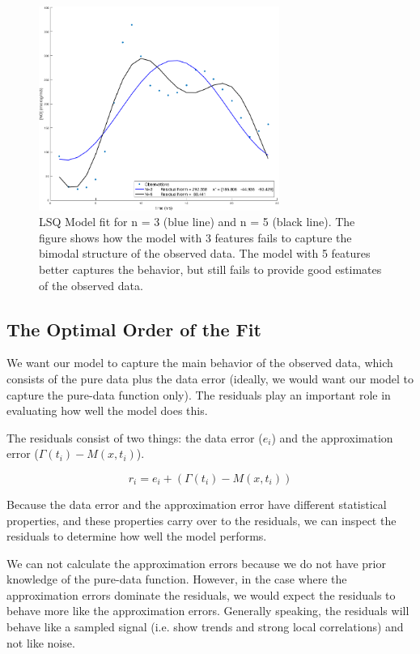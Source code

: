 \begin{figure}[htb]
\centering
\includegraphics[width=0.7\textwidth]{../img/figure1}
\caption{LSQ Model fit for n = 3 (blue line) and n = 5 (black line). The figure shows how the model with 3 features fails to capture the bimodal structure of the observed data. The model with 5 features better captures the behavior, but still fails to provide good estimates of the observed data.}
\label{fig:figure1}
\end{figure}

\subsection{The Optimal Order of the Fit}
We want our model to capture the main behavior of the observed data, which consists of the pure data plus the data error (ideally, we would want our model to capture the pure-data function only). The residuals play an important role in evaluating how well the model does this. 

The residuals consist of two things: the data error ($e_i$) and the approximation error ($\Gamma(t_i) - M(x,t_i)$). 

\begin{equation}
r_{i} = e_{i} + (\Gamma(t_{i}) - M(x,t_{i}))
\label{eq:firstEquation}
\end{equation}


Because the data error and the approximation error have different statistical properties, and these properties carry over to the residuals, we can inspect the residuals to determine how well the model performs. 

We can not calculate the approximation errors because we do not have prior knowledge of the pure-data function. However, in the case where the approximation errors dominate the residuals, we would expect the residuals to behave more like the approximation errors. Generally speaking, the residuals will behave like a sampled signal (i.e. show trends and strong local correlations) and not like noise. 

